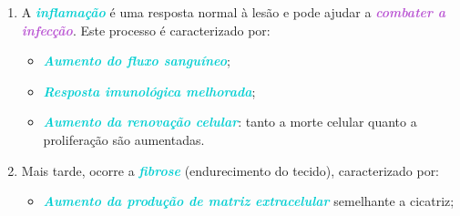 \documentclass[11pt,a4paper]{article}
\begin{document}
		\begin{enumerate}
			\item A \textcolor{DarkTurquoise}{\textbf{\textit{inflamação}}} é uma resposta normal à lesão e pode ajudar a \textcolor{MediumOrchid}{\textbf{\textit{combater a infecção}}}. Este processo é caracterizado por:
				\begin{itemize}
					\item \textcolor{DarkTurquoise}{\textbf{\textit{Aumento do fluxo sanguíneo}}};
					\item \textcolor{DarkTurquoise}{\textbf{\textit{Resposta imunológica melhorada}}};
					\item \textcolor{DarkTurquoise}{\textbf{\textit{Aumento da renovação celular}}}: tanto a morte celular quanto a proliferação são aumentadas.
				\end{itemize}

			\item Mais tarde, ocorre a \textcolor{DarkTurquoise}{\textbf{\textit{fibrose}}} (endurecimento do tecido), caracterizado por:
				\begin{itemize}
					\item \textcolor{DarkTurquoise}{\textbf{\textit{Aumento da produção de matriz extracelular}}} semelhante a cicatriz;
				\end{itemize}
		\end{enumerate}

\end{document}

